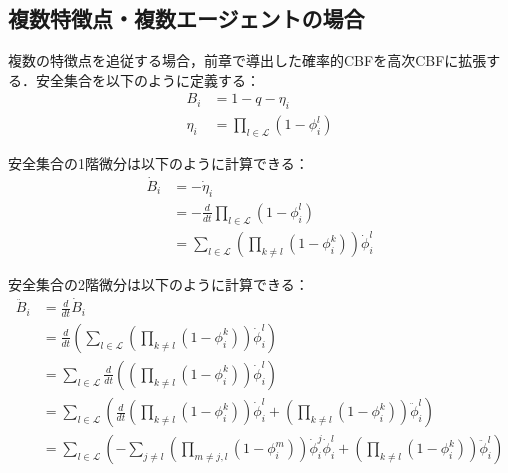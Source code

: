 \subsection{複数特徴点・複数エージェントの場合}

複数の特徴点を追従する場合，前章で導出した確率的CBFを高次CBFに拡張する．安全集合を以下のように定義する：
\begin{equation}
\begin{aligned}
B_i &= 1 - q - \eta_i \\
\eta_i &= \prod_{l \in \mathcal{L}} (1 - \phi_i^l)
\label{eq:multi_hocbf_safe_set}
\end{aligned}
\end{equation}

安全集合の1階微分は以下のように計算できる：
\begin{equation}
\begin{aligned}
\dot{B}_i &= -\dot{\eta}_i \\
&= -\frac{d}{dt} \prod_{l \in \mathcal{L}} (1 - \phi_i^l) \\
&= \sum_{l \in \mathcal{L}} \left(\prod_{k \neq l} (1 - \phi_i^k)\right) \dot{\phi}_i^l
\label{eq:multi_hocbf_derivative}
\end{aligned}
\end{equation}

安全集合の2階微分は以下のように計算できる：
\begin{equation}
\begin{aligned}
\ddot{B}_i &= \frac{d}{dt} \dot{B}_i \\
&= \frac{d}{dt} \left(\sum_{l \in \mathcal{L}} \left(\prod_{k \neq l} (1 - \phi_i^k)\right) \dot{\phi}_i^l\right) \\
&= \sum_{l \in \mathcal{L}} \frac{d}{dt} \left(\left(\prod_{k \neq l} (1 - \phi_i^k)\right) \dot{\phi}_i^l\right) \\
&= \sum_{l \in \mathcal{L}} \left(\frac{d}{dt} \left(\prod_{k \neq l} (1 - \phi_i^k)\right) \dot{\phi}_i^l + \left(\prod_{k \neq l} (1 - \phi_i^k)\right) \ddot{\phi}_i^l\right) \\
&= \sum_{l \in \mathcal{L}} \left(-\sum_{j \neq l} \left(\prod_{m \neq j, l} (1 - \phi_i^m)\right) \dot{\phi}_i^j \dot{\phi}_i^l + \left(\prod_{k \neq l} (1 - \phi_i^k)\right) \ddot{\phi}_i^l\right)
\label{eq:multi_hocbf_second_derivative}
\end{aligned}
\end{equation}


